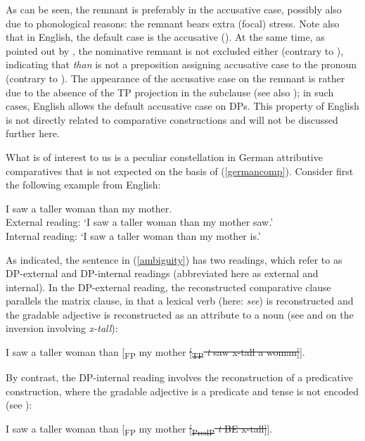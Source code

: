 As can be seen, the remnant is preferably in the accusative case, possibly also due to phonological reasons: the remnant bears extra (focal) stress. Note also that in English, the default case is the accusative (\citealt{schuetze2001}). At the same time, as pointed out by \citet[618]{bhatttakahashi2011}, the nominative remnant is not excluded either (contrary to \citealt{pancheva2006}), indicating that \textit{than} is not a preposition assigning accusative case to the pronoun (contrary to \citealt{hankamer1973}). The appearance of the accusative case on the remnant is rather due to the absence of the TP projection in the subclause (see also \citealt{bacskaiatkari2014alh, bacskaiatkari2018langsci}); in such cases, English allows the default accusative case on DPs. This property of English is not directly related to comparative constructions and will not be discussed further here.

What is of interest to us is a peculiar constellation in German attributive comparatives that is not expected on the basis of (\ref{germancomp}). Consider first the following example from English:

\ea I saw a taller woman than my mother. \label{ambiguity}\\
External reading: `I saw a taller woman than my mother saw.'\\
Internal reading: `I saw a taller woman than my mother is.'
\z

As indicated, the sentence in (\ref{ambiguity}) has two readings, which \citet{lernerpinkal1995} refer to as DP-external and DP-internal readings (abbreviated here as external and internal). In the DP-external reading, the reconstructed comparative clause parallels the matrix clause, in that a lexical verb (here: \textit{see}) is reconstructed and the gradable adjective is reconstructed as an attribute to a noun (see \citealt{kennedymerchant2000} and \citealt[125--139]{bacskaiatkari2018langsci} on the inversion involving \textit{x-tall}):

\ea I saw a taller woman than [\textsubscript{FP} my mother \sout{[\textsubscript{TP} \textit{t} saw x-tall a woman]}]. \label{englishext}
\z

By contrast, the DP-internal reading involves the reconstruction of a predicative construction, where the gradable adjective is a predicate and tense is not encoded (see \citealt{bacskaiatkari2017icgl}):

\ea I saw a taller woman than [\textsubscript{FP} my mother \sout{[\textsubscript{PredP} \textit{t} BE x-tall]}]. \label{englishint}
\z

